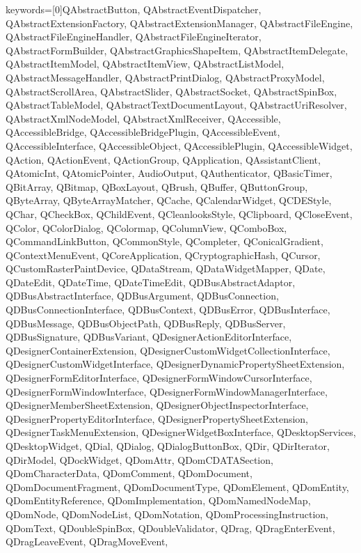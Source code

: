 {
  keywords=[0]{QAbstractButton, QAbstractEventDispatcher,
QAbstractExtensionFactory, QAbstractExtensionManager, QAbstractFileEngine,
QAbstractFileEngineHandler, QAbstractFileEngineIterator, QAbstractFormBuilder,
QAbstractGraphicsShapeItem, QAbstractItemDelegate, QAbstractItemModel,
QAbstractItemView, QAbstractListModel, QAbstractMessageHandler,
QAbstractPrintDialog, QAbstractProxyModel, QAbstractScrollArea, QAbstractSlider,
QAbstractSocket, QAbstractSpinBox, QAbstractTableModel,
QAbstractTextDocumentLayout, QAbstractUriResolver, QAbstractXmlNodeModel,
QAbstractXmlReceiver, QAccessible, QAccessibleBridge, QAccessibleBridgePlugin,
QAccessibleEvent, QAccessibleInterface, QAccessibleObject, QAccessiblePlugin,
QAccessibleWidget, QAction, QActionEvent, QActionGroup, QApplication,
QAssistantClient, QAtomicInt, QAtomicPointer, AudioOutput, QAuthenticator,
QBasicTimer, QBitArray, QBitmap, QBoxLayout, QBrush, QBuffer, QButtonGroup,
QByteArray, QByteArrayMatcher, QCache, QCalendarWidget, QCDEStyle, QChar,
QCheckBox, QChildEvent, QCleanlooksStyle, QClipboard, QCloseEvent, QColor,
QColorDialog, QColormap, QColumnView, QComboBox, QCommandLinkButton,
QCommonStyle, QCompleter, QConicalGradient, QContextMenuEvent, QCoreApplication,
QCryptographicHash, QCursor, QCustomRasterPaintDevice, QDataStream,
QDataWidgetMapper, QDate, QDateEdit, QDateTime, QDateTimeEdit,
QDBusAbstractAdaptor, QDBusAbstractInterface, QDBusArgument, QDBusConnection,
QDBusConnectionInterface, QDBusContext, QDBusError, QDBusInterface,
QDBusMessage, QDBusObjectPath, QDBusReply, QDBusServer, QDBusSignature,
QDBusVariant, QDesignerActionEditorInterface, QDesignerContainerExtension,
QDesignerCustomWidgetCollectionInterface, QDesignerCustomWidgetInterface,
QDesignerDynamicPropertySheetExtension, QDesignerFormEditorInterface,
QDesignerFormWindowCursorInterface, QDesignerFormWindowInterface,
QDesignerFormWindowManagerInterface, QDesignerMemberSheetExtension,
QDesignerObjectInspectorInterface, QDesignerPropertyEditorInterface,
QDesignerPropertySheetExtension, QDesignerTaskMenuExtension,
QDesignerWidgetBoxInterface, QDesktopServices, QDesktopWidget, QDial, QDialog,
QDialogButtonBox, QDir, QDirIterator, QDirModel, QDockWidget, QDomAttr,
QDomCDATASection, QDomCharacterData, QDomComment, QDomDocument,
QDomDocumentFragment, QDomDocumentType, QDomElement, QDomEntity,
QDomEntityReference, QDomImplementation, QDomNamedNodeMap, QDomNode,
QDomNodeList, QDomNotation, QDomProcessingInstruction, QDomText, QDoubleSpinBox,
QDoubleValidator, QDrag, QDragEnterEvent, QDragLeaveEvent, QDragMoveEvent,
}}
